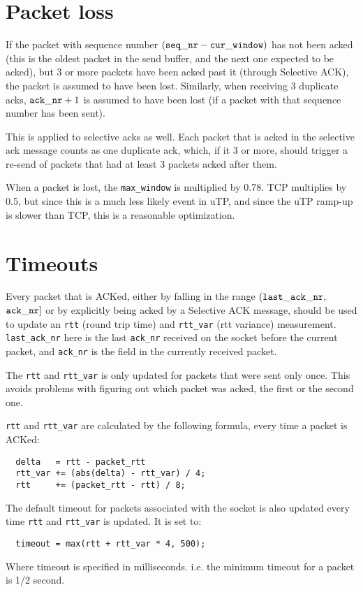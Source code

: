 \documentclass[11pt,a4paper,oneside,draft]{article}
\begin{document}
{\section {Packet loss}}

If the packet with sequence number $({\tt seq\_nr} - {\tt cur\_window})$ has not been acked (this is the oldest packet in the send buffer, and the next one expected to be acked), but 3 or more packets have been acked past it (through Selective ACK), the packet is assumed to have been lost. Similarly, when receiving 3 duplicate acks, ${\tt ack\_nr} + 1$ is assumed to have been lost (if a packet with that sequence number has been sent).

This is applied to selective acks as well. Each packet that is acked in the selective ack message counts as one duplicate ack, which, if it 3 or more, should trigger a re-send of packets that had at least 3 packets acked after them.

When a packet is lost, the {\tt max\_window} is multiplied by 0.78. TCP multiplies by 0.5, but since this is a much less likely event in uTP, and since the uTP ramp-up is slower than TCP, this is a reasonable optimization.

{\section {Timeouts}}

Every packet that is ACKed, either by falling in the range $({\tt last\_ack\_nr},$ $ {\tt ack\_nr}]$ or by explicitly being acked by a Selective ACK message, should be used to update an {\tt rtt} (round trip time) and {\tt rtt\_var} (rtt variance) measurement. {\tt last\_ack\_nr} here is the last {\tt ack\_nr} received on the socket before the current packet, and {\tt ack\_nr} is the field in the currently received packet.

The {\tt rtt} and {\tt rtt\_var} is only updated for packets that were sent only once. This avoids problems with figuring out which packet was acked, the first or the second one.

{\tt rtt} and {\tt rtt\_var} are calculated by the following formula, every time a packet is ACKed:
{\begin{verbatim}
  delta   = rtt - packet_rtt
  rtt_var += (abs(delta) - rtt_var) / 4;
  rtt     += (packet_rtt - rtt) / 8;
\end{verbatim}}

The default timeout for packets associated with the socket is also updated every time {\tt rtt} and {\tt rtt\_var} is updated. It is set to:
{\begin{verbatim}
  timeout = max(rtt + rtt_var * 4, 500);
\end{verbatim}}
Where timeout is specified in milliseconds. i.e. the minimum timeout for a packet is 1/2 second.
\end{document}
